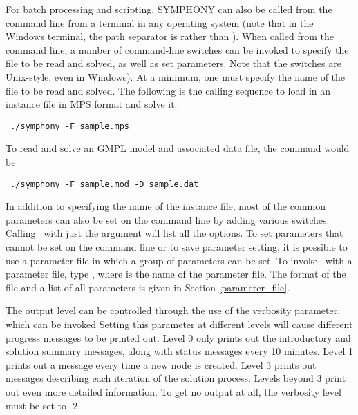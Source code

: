 For batch processing and scripting, SYMPHONY can also be called from the
command line from a terminal in any operating system (note that in the Windows
terminal, the path separator is \code{\bs} rather than \code{/}).
When called from the command line, a number of command-line switches can be
invoked to specify the file to be read and solved, as well as set parameters.
Note that the switches are Unix-style, even in Windows). At a minimum, one must
specify the name of the file to be read and solved. The following is the
calling sequence to load in an instance file in MPS format and 
solve it.
{\color{Brown}
\begin{verbatim}
 ./symphony -F sample.mps
\end{verbatim}
} 
To read and solve an GMPL model and associated data file, the command would be
{\color{Brown}
\begin{verbatim}
 ./symphony -F sample.mod -D sample.dat
\end{verbatim}
} In addition to specifying the name of the instance file, most of the common
parameters can also be set on the command line by adding various switches.
Calling \BB\ with just the argument  will list all the options. To
set parameters that cannot be set on the command line or to save parameter
setting, it is possible to use a parameter file in which a group of parameters
can be set. To invoke \BB\ with a parameter file, type , where  is the name of the parameter file. The format
of the file and a list of all parameters is given in Section
\ref{parameter_file}.

The output level can be controlled through the use of the verbosity parameter,
which can be invoked Setting this parameter at different levels will cause
different progress messages to be printed out. Level 0 only prints out the
introductory and solution summary messages, along with status messages every
10 minutes. Level 1 prints out a message every time a new node is created.
Level 3 prints out messages describing each iteration of the solution process.
Levels beyond 3 print out even more detailed information. To get no output at
all, the verbosity level must be set to -2.


